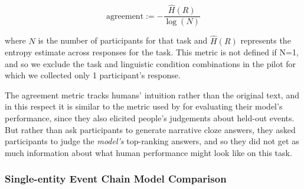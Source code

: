 \documentclass[10pt,a4paper]{article}
\begin{document}
$$\mbox{agreement} := - \frac{\hat{H}(R)}{\log(N)}$$

where $N$ is the number of participants for that task and $\hat{H}(R)$ represents the entropy estimate across responses for the task. This metric is not defined if N=1, and so we exclude the task and linguistic condition combinations in the pilot for which we collected only 1 participant's response.

The agreement metric tracks humans' intuition rather than the original text, and in this respect it is similar to the metric used by  for evaluating their model's performance, since they also elicited people's judgements about held-out events. But rather than ask participants to generate narrative cloze answers, they asked participants to judge the {\em model's} top-ranking answers, and so they did not get as much information about what human performance might look like on this task.

\subsubsection{Single-entity Event Chain Model Comparison}
\end{document}
